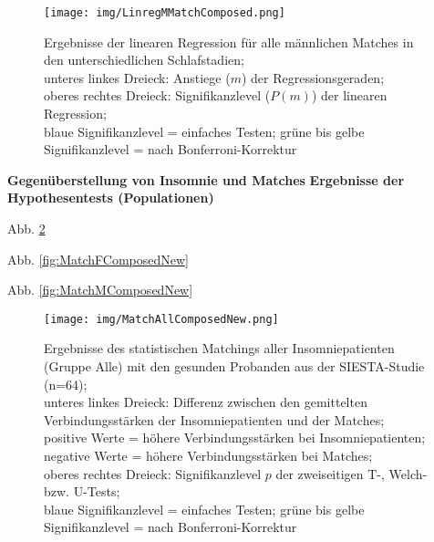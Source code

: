 \begin{figure}[H]
	\centering
	\texttt{[image: img/LinregMMatchComposed.png]}
	\caption[Ergebnisse der linearen Regression für alle männlichen Matches]{Ergebnisse der linearen Regression für alle männlichen Matches in den unterschiedlichen Schlafstadien;\\unteres linkes Dreieck: Anstiege ($m$) der Regressionsgeraden;\\oberes rechtes Dreieck: Signifikanzlevel ($P(m)$) der linearen Regression;\\blaue Signifikanzlevel = einfaches Testen; grüne bis gelbe Signifikanzlevel = nach Bonferroni-Korrektur}
	\label{fig:LinregMMatchComposed}
\end{figure}

\textbf{Gegenüberstellung von Insomnie und Matches}
\textbf{Ergebnisse der Hypothesentests (Populationen)}

Abb. \ref{fig:MatchAllComposedNew}

Abb. \ref{fig:MatchFComposedNew}

Abb. \ref{fig:MatchMComposedNew}




\begin{figure}[H]
	\centering
	\texttt{[image: img/MatchAllComposedNew.png]}
	\caption[Ergebnisse des statistischen Matchings der Insomniepatienten mit den gesunden Probanden]{Ergebnisse des statistischen Matchings aller Insomniepatienten (Gruppe Alle) mit den gesunden Probanden aus der SIESTA-Studie (n=64);\\unteres linkes Dreieck: Differenz zwischen den gemittelten Verbindungsstärken der Insomniepatienten und der Matches; positive Werte = höhere Verbindungsstärken bei Insomniepatienten; negative Werte = höhere Verbindungsstärken bei Matches;\\oberes rechtes Dreieck: Signifikanzlevel $p$ der zweiseitigen T-, Welch- bzw. U-Tests;\\blaue Signifikanzlevel = einfaches Testen; grüne bis gelbe Signifikanzlevel = nach Bonferroni-Korrektur}
	\label{fig:MatchAllComposedNew}
\end{figure}




